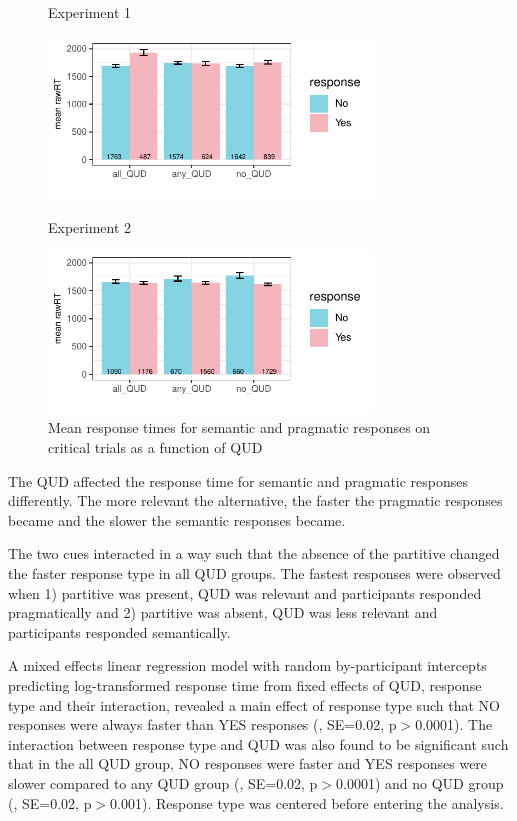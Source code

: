 \documentclass[12pt]{article}
\begin{document}
\begin{figure}[!ht] 
    \begin{minipage}{.5\textwidth}
        \caption*{Experiment 1}
        \includegraphics[height=4.3cm]{img/exp4_response_time.pdf}
    \end{minipage}%
    \begin{minipage}{.5\textwidth}
        \caption*{Experiment 2}
        \includegraphics[height=4.3cm]{img/exp5_response_time.pdf}
    \end{minipage}%
    \caption{Mean response times for semantic and pragmatic responses on critical trials as a function of QUD}
\end{figure}

The QUD affected the response time for semantic and pragmatic responses differently. The more relevant the alternative, the faster the pragmatic responses became and the slower the semantic responses became. 

The two cues interacted in a way such that the absence of the partitive changed the faster response type in all QUD groups. The fastest responses were observed when 1) partitive was present, QUD was relevant and participants responded pragmatically and 2) partitive was absent, QUD was less relevant and participants responded semantically. 

A mixed effects linear regression model with random by-participant intercepts predicting log-transformed response time from fixed effects of QUD, response type and their interaction, revealed a main effect of response type such that NO responses were always faster than YES responses (, SE=0.02, p$>$0.0001). The interaction between response type and QUD was also found to be significant such that in the all QUD group, NO responses were faster and YES responses were slower compared to any QUD group (, SE=0.02, p$>$0.0001) and no QUD group (, SE=0.02, p$>$0.001). Response type was centered before entering the analysis.
\end{document}
